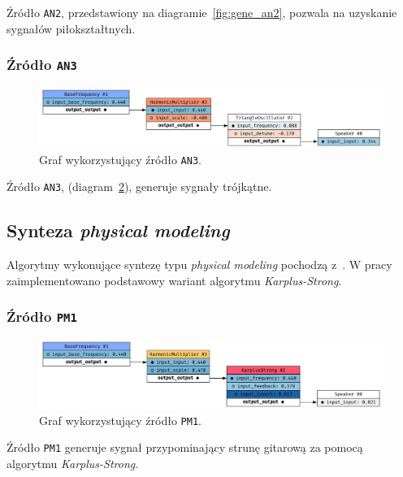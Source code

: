 Źródło \texttt{AN2}, przedstawiony na diagramie~\ref{fig:gene_an2},
pozwala na uzyskanie sygnałów piłokształtnych.


\subsubsection{Źródło \texttt{AN3}}

\begin{figure}[H]
    \centering
    \includegraphics[width=1.0\linewidth]{rys06/gene_an3.png}
    \caption{
      Graf wykorzystujący źródło \texttt{AN3}.
    }\label{fig:gene_an3}
\end{figure}

Źródło \texttt{AN3}, (diagram~\ref{fig:gene_an3}), generuje sygnały trójkątne.


\subsection{Synteza \textit{physical modeling}}

Algorytmy wykonujące syntezę typu \textit{physical modeling}
pochodzą z~\cite{computational_music_synthesis}. W pracy zaimplementowano
podstawowy wariant algorytmu \textit{Karplus-Strong}.

\subsubsection{Źródło \texttt{PM1}}

\begin{figure}[H]
    \centering
    \includegraphics[width=1.0\linewidth]{rys06/gene_pm1.png}
    \caption{
      Graf wykorzystujący źródło \texttt{PM1}.
    }\label{fig:gene_an3}
\end{figure}

Źródło \texttt{PM1} generuje sygnał przypominający strunę gitarową 
za pomocą algorytmu \textit{Karplus-Strong}.

